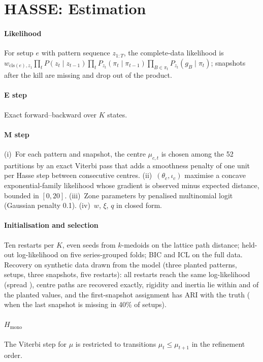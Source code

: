 \section{HASSE: Estimation}
\label{app:hasse}

\paragraph*{Likelihood} For setup $e$ with pattern sequence $z_{1:T}$, the complete-data likelihood is $w_{\mathrm{cls}(e),z_1}\prod_t P(z_t\mid z_{t-1})\prod_t P_{z_t}(\pi_t\mid\pi_{t-1})\prod_{B\in\pi_t}P_{z_t}(g_B\mid\pi_t)$; snapshots after the kill are missing and drop out of the product.
\paragraph*{E step} Exact forward--backward over $K$ states.
\paragraph*{M step} (i)~For each pattern and snapshot, the centre $\mu_{c,t}$ is chosen among the 52 partitions by an exact Viterbi pass that adds a smoothness penalty of one unit per Hasse step between consecutive centres. (ii)~$(\theta_c,\iota_c)$ maximise a concave exponential-family likelihood whose gradient is observed minus expected distance, bounded in $[0,20]$. (iii)~Zone parameters by penalised multinomial logit (Gaussian penalty 0.1). (iv)~$w$, $\xi$, $q$ in closed form.
\paragraph*{Initialisation and selection} Ten restarts per $K$, even seeds from $k$-medoids on the lattice path distance; held-out log-likelihood on five series-grouped folds; BIC and ICL on the full data. Recovery on synthetic data drawn from the model (three planted patterns,  setups, three snapshots, five restarts): all restarts reach the same log-likelihood (spread ),  centre paths are recovered exactly, rigidity and inertia lie within  and  of the planted values, and the first-snapshot assignment has ARI  with the truth ( when the last snapshot is missing in 40\% of setups).
\paragraph*{$H_{\mathrm{mono}}$} The Viterbi step for $\mu$ is restricted to transitions $\mu_{t}\leq\mu_{t+1}$ in the refinement order.

